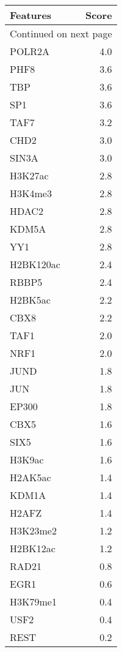 \begin{longtable}{lr}
\caption{}\\
\toprule
  Features &  Score \\
\midrule
\endhead
\midrule
\multicolumn{2}{r}{{Continued on next page}} \\
\midrule
\endfoot

\bottomrule
\endlastfoot
    POLR2A &    4.0 \\
      PHF8 &    3.6 \\
       TBP &    3.6 \\
       SP1 &    3.6 \\
      TAF7 &    3.2 \\
      CHD2 &    3.0 \\
     SIN3A &    3.0 \\
   H3K27ac &    2.8 \\
   H3K4me3 &    2.8 \\
     HDAC2 &    2.8 \\
     KDM5A &    2.8 \\
       YY1 &    2.8 \\
 H2BK120ac &    2.4 \\
     RBBP5 &    2.4 \\
   H2BK5ac &    2.2 \\
      CBX8 &    2.2 \\
      TAF1 &    2.0 \\
      NRF1 &    2.0 \\
      JUND &    1.8 \\
       JUN &    1.8 \\
     EP300 &    1.8 \\
      CBX5 &    1.6 \\
      SIX5 &    1.6 \\
    H3K9ac &    1.6 \\
   H2AK5ac &    1.4 \\
     KDM1A &    1.4 \\
     H2AFZ &    1.4 \\
  H3K23me2 &    1.2 \\
  H2BK12ac &    1.2 \\
     RAD21 &    0.8 \\
      EGR1 &    0.6 \\
  H3K79me1 &    0.4 \\
      USF2 &    0.4 \\
      REST &    0.2 \\
\end{longtable}
